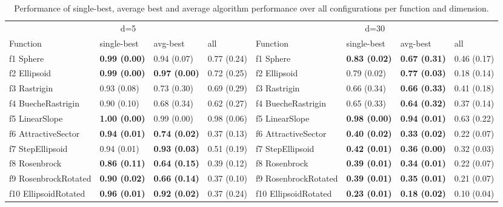 \begin{table}
\caption{Performance of single-best, average best and average algorithm performance over all configurations per function and dimension.}
\begin{tabular}{llllllll}
\toprule
\multicolumn{4}{c}{d=5} & \multicolumn{4}{c}{d=30} \\
Function & single-best & avg-best & all & Function & single-best & avg-best & all \\
\midrule
f1 Sphere & \textbf{0.99 (0.00)} & 0.94 (0.07) & 0.77 (0.24) & f1 Sphere & \textbf{0.83 (0.02)} & \textbf{0.67 (0.31)} & 0.46 (0.17) \\
f2 Ellipsoid & \textbf{0.99 (0.00)} & \textbf{0.97 (0.00)} & 0.72 (0.25) & f2 Ellipsoid & 0.79 (0.02) & \textbf{0.77 (0.03)} & 0.18 (0.14) \\
f3 Rastrigin & 0.93 (0.08) & 0.73 (0.30) & 0.69 (0.29) & f3 Rastrigin & 0.66 (0.34) & \textbf{0.66 (0.33)} & 0.41 (0.18) \\
f4 BuecheRastrigin & 0.90 (0.10) & 0.68 (0.34) & 0.62 (0.27) & f4 BuecheRastrigin & 0.65 (0.33) & \textbf{0.64 (0.32)} & 0.37 (0.14) \\
f5 LinearSlope & \textbf{1.00 (0.00)} & 0.99 (0.00) & 0.98 (0.06) & f5 LinearSlope & \textbf{0.98 (0.00)} & \textbf{0.94 (0.01)} & 0.63 (0.22) \\
f6 AttractiveSector & \textbf{0.94 (0.01)} & \textbf{0.74 (0.02)} & 0.37 (0.13) & f6 AttractiveSector & \textbf{0.40 (0.02)} & \textbf{0.33 (0.02)} & 0.22 (0.07) \\
f7 StepEllipsoid & 0.94 (0.01) & \textbf{0.93 (0.03)} & 0.51 (0.19) & f7 StepEllipsoid & \textbf{0.42 (0.01)} & \textbf{0.36 (0.00)} & 0.32 (0.03) \\
f8 Rosenbrock & \textbf{0.86 (0.11)} & \textbf{0.64 (0.15)} & 0.39 (0.12) & f8 Rosenbrock & \textbf{0.39 (0.01)} & \textbf{0.34 (0.01)} & 0.22 (0.07) \\
f9 RosenbrockRotated & \textbf{0.90 (0.02)} & \textbf{0.66 (0.14)} & 0.37 (0.10) & f9 RosenbrockRotated & \textbf{0.39 (0.01)} & \textbf{0.35 (0.01)} & 0.21 (0.07) \\
f10 EllipsoidRotated & \textbf{0.96 (0.01)} & \textbf{0.92 (0.02)} & 0.37 (0.24) & f10 EllipsoidRotated & \textbf{0.23 (0.01)} & \textbf{0.18 (0.02)} & 0.10 (0.04) \\

\end{tabular}
\end{table}
